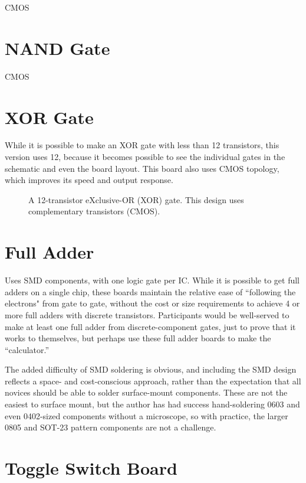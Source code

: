 \documentclass[12pt]{article}
\begin{document}
CMOS

\section{NAND Gate}

CMOS

\section{XOR Gate}

While it is possible to make an XOR gate with less than 12 transistors, this version uses 12, because it becomes possible to see the individual gates in the schematic and even the board layout. This board also uses CMOS topology, which improves its speed and output response.

\begin{figure}[!hb]
\begin{center}
\medskip
\caption{A 12-transistor eXclusive-OR (XOR) gate. This design uses complementary transistors (CMOS).}
\label{fig:xor1}
\end{center}
\end{figure}


\section{Full Adder}

Uses SMD components, with one logic gate per IC. While it is possible to get full adders on a single chip, these boards maintain the relative ease of ``following the electrons" from gate to gate, without the cost or size requirements to achieve 4 or more full adders with discrete transistors. Participants would be well-served to make at least one full adder from discrete-component gates, just to prove that it works to themselves, but perhaps use these full adder boards to make the ``calculator.''

The added difficulty of SMD soldering is obvious, and including the SMD design reflects a space- and cost-conscious approach, rather than the expectation that all novices should be able to solder surface-mount components. These are not the easiest to surface mount, but the author has had success hand-soldering 0603 and even 0402-sized components without a microscope, so with practice, the larger 0805 and SOT-23 pattern components are not a challenge.

\section{Toggle Switch Board}
\end{document}
